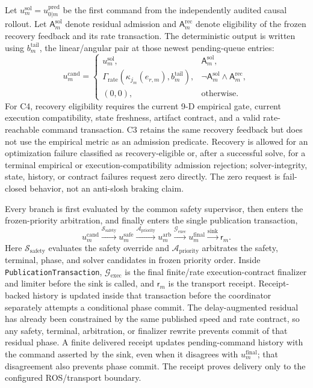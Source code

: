 Let $u_m^{\mathrm{sol}}=u_{0|m}^{\mathrm{pred}}$ be the first command from the
independently audited causal rollout.  Let $\mathsf A_m^{\mathrm{sol}}$ denote
residual admission and $\mathsf A_m^{\mathrm{rec}}$ denote eligibility of the
frozen recovery feedback and its rate transaction.  The deterministic output
is written using $b_m^{\mathrm{tail}}$, the linear/angular pair at those
newest pending-queue entries:
\begin{equation}
u_m^{\mathrm{cand}}=
\begin{cases}
u_m^{\mathrm{sol}}, &\mathsf A_m^{\mathrm{sol}},\\
\Gamma_{\mathrm{rate}}
\!\left(\kappa_{j_m}(e_{r,m}),b_m^{\mathrm{tail}}\right),
&\neg\mathsf A_m^{\mathrm{sol}}\wedge
 \mathsf A_m^{\mathrm{rec}},\\
(0,0),&\text{otherwise}.
\end{cases}
\label{eq:supervisor}
\end{equation}
For C4, recovery eligibility requires the current 9-D empirical gate, current
execution compatibility, state freshness, artifact contract, and a valid
rate-reachable command transaction.  C3 retains the same recovery feedback
but does not use the empirical metric as an admission predicate.  Recovery is
allowed for an optimization failure classified as recovery-eligible or, after a
successful solve, for a terminal empirical or execution-compatibility admission
rejection; solver-integrity, state, history, or contract failures request zero
directly.  The zero request is fail-closed behavior, not an anti-slosh braking
claim.

Every branch is first evaluated by the common safety supervisor, then enters
the frozen-priority arbitration, and finally enters the single publication
transaction,
\begin{equation}
u_m^{\mathrm{cand}}
\xrightarrow{\mathcal S_{\mathrm{safety}}}
u_m^{\mathrm{safe}}
\xrightarrow{\mathcal A_{\mathrm{priority}}}
u_m^{\mathrm{arb}}
\xrightarrow{\mathcal G_{\mathrm{exec}}}
u_m^{\mathrm{final}}
\xrightarrow{\mathrm{sink}}
\mathsf r_m.
\label{eq:publication_chain}
\end{equation}
Here $\mathcal S_{\mathrm{safety}}$ evaluates the safety override and
$\mathcal A_{\mathrm{priority}}$ arbitrates the safety, terminal, phase, and
solver candidates in frozen priority order.  Inside
\texttt{PublicationTransaction}, $\mathcal G_{\mathrm{exec}}$ is the final
finite/rate execution-contract finalizer and limiter before the sink is
called, and $\mathsf r_m$ is the transport receipt.  Receipt-backed history is
updated inside that transaction before the coordinator separately attempts a
conditional phase commit.  The delay-augmented residual
has already been constrained by the same published speed and rate contract, so
any safety, terminal, arbitration, or finalizer rewrite prevents commit of that
residual phase.  A finite delivered receipt updates pending-command history
with the command asserted by the sink, even when it disagrees with
$u_m^{\mathrm{final}}$; that disagreement also prevents phase commit.  The
receipt proves delivery only to the configured ROS/transport boundary.

